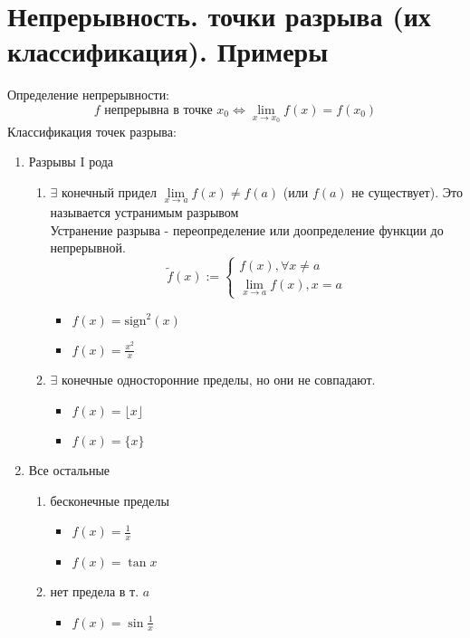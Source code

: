 \documentclass[11pt, a4paper, utf-8]{article}
\def\lima{\lim \limits_{x \to a}}
\begin{document}
    \section{Непрерывность. точки разрыва (их классификация). Примеры}
    Определение непрерывности:
    $$f \text{ непрерывна в точке } x_0 \iff \lim_{x \to x_0} f(x) = f(x_0)$$
    Классификация точек разрыва:
    \begin{enumerate}
        \item Разрывы I рода
        \begin{enumerate}
            \item $\exists$ конечный придел $\lima f(x) \neq f(a)$ (или $f(a)$ не существует). Это называется устранимым разрывом\\
            Устранение разрыва - переопределение или доопределение функции до непрерывной.
            $$\tilde{f}(x) := \begin{cases}
                f(x), \forall x \neq a \\
                \lima f(x), x = a
            \end{cases}$$
            \begin{itemize}
                \item $f(x) = \text{sign}^2 (x)$
                \item $f(x) = \frac{x^2}{x}$
            \end{itemize}
            \item $\exists$ конечные односторонние пределы, но они не совпадают.
            \begin{itemize}
                \item $f(x) = \lfloor x \rfloor$
                \item $f(x) = \{x\}$
            \end{itemize}
        \end{enumerate}
        \item Все остальные
        \begin{enumerate}
            \item бесконечные пределы
            \begin{itemize}
                \item $f(x) = \frac{1}{x}$
                \item $f(x) = \tan x$
            \end{itemize}
            \item нет предела в т. $a$
            \begin{itemize}
                \item $f(x) = \sin \frac{1}{x}$

\end{itemize}
\end{enumerate}
\end{enumerate}
\end{document}
